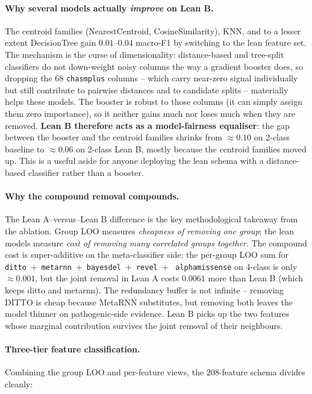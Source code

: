 \documentclass[11pt,a4paper]{article}
\begin{document}
\paragraph{Why several models actually \emph{improve} on Lean B.}
The centroid families (NearestCentroid, CosineSimilarity), KNN, and to
a lesser extent DecisionTree gain $0.01$--$0.04$ macro-F1 by switching
to the lean feature set. The mechanism is the curse of dimensionality:
distance-based and tree-split classifiers do not down-weight noisy
columns the way a gradient booster does, so dropping the 68
\texttt{chasmplus} columns -- which carry near-zero signal individually
but still contribute to pairwise distances and to candidate splits --
materially helps these models. The booster is robust to those columns
(it can simply assign them zero importance), so it neither gains much
nor loses much when they are removed. \textbf{Lean B therefore acts as
a model-fairness equaliser}: the gap between the booster and the
centroid families shrinks from $\approx 0.10$ on 2-class baseline to
$\approx 0.06$ on 2-class Lean B, mostly because the centroid families
moved up. This is a useful aside for anyone deploying the lean schema
with a distance-based classifier rather than a booster.

\paragraph{Why the compound removal compounds.}
The Lean A--versus--Lean B difference is the key methodological
takeaway from the ablation. Group LOO measures \emph{cheapness of
removing one group}; the lean models measure \emph{cost of removing
many correlated groups together}. The compound cost is super-additive
on the meta-classifier side: the per-group LOO sum for
\texttt{ditto}~+~\texttt{metarnn}~+~\texttt{bayesdel}~+~\texttt{revel}~+~%
\texttt{alphamissense} on 4-class is only $\approx 0.001$, but the
joint removal in Lean A costs $0.0061$ more than Lean B (which keeps
ditto and metarnn). The redundancy buffer is not infinite -- removing
DITTO is cheap because MetaRNN substitutes, but removing both leaves
the model thinner on pathogenic-side evidence. Lean B picks up the two
features whose marginal contribution survives the joint removal of
their neighbours.

\paragraph{Three-tier feature classification.}
Combining the group LOO and per-feature views, the $208$-feature schema
divides cleanly:
\end{document}
